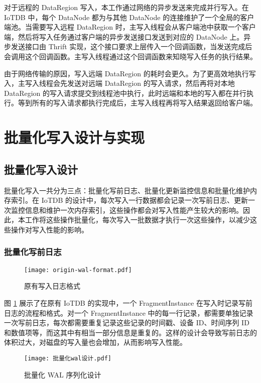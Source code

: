 对于远程的 DataRegion 写入，本工作通过网络的异步发送来完成并行写入。在 IoTDB 中，每个 DataNode 都为与其他 DataNode 的连接维护了一个全局的客户端池。当需要写入远程 DataRegion 时，主写入线程会从客户端池中获取一个客户端，然后将写入任务通过客户端的异步发送接口发送到对应的 DataNode 上。异步发送接口由 Thrift 实现，这个接口要求上层传入一个回调函数，当发送完成后会调用这个回调函数。主写入线程通过这个回调函数来知晓写入任务的执行结果。

由于网络传输的原因，写入远端 DataRegion 的耗时会更久。为了更高效地执行写入，主写入线程会先发送对远端 DataRegion 的写入请求，然后再将对本地 DataRegion 的写入请求提交到线程池中执行，此时远端和本地的写入都在并行执行。等到所有的写入请求都执行完成后，主写入线程再将写入结果返回给客户端。

\section{批量化写入设计与实现}
\subsection{批量化写入设计}
批量化写入一共分为三点：批量化写前日志、批量化更新监控信息和批量化维护内存索引。在 IoTDB 的设计中，每次写入一行数据都会记录一次写前日志、更新一次监控信息和维护一次内存索引，这些操作都会对写入性能产生较大的影响。因此，本工作将这些操作批量化，每次写入一批数据才执行一次这些操作，以减少这些操作对写入性能的影响。

\subsubsection{批量化写前日志}
\begin{figure}
  \centering
  \texttt{[image: origin-wal-format.pdf]}
  \caption{原有写入日志格式}
  \label{fig:origin-wal-format}
\end{figure}

图 \ref{fig:origin-wal-format} 展示了在原有 IoTDB 的实现中，一个 FragmentInstance 在写入时记录写前日志的流程和格式。对一个 FragmentInstance 中的每一行记录，都需要单独记录一次写前日志，每次都需要重复记录这些记录的时间戳、设备 ID、时间序列 ID 和数值项等，而这其中有相当一部分信息是重复的。这样的设计会导致写前日志的体积过大，对磁盘的写入量也会增加，从而影响写入性能。

\begin{figure}
  \centering
  \texttt{[image: 批量化wal设计.pdf]}
  \caption{批量化 WAL 序列化设计}
  \label{fig:batch-wal-design}
\end{figure}

